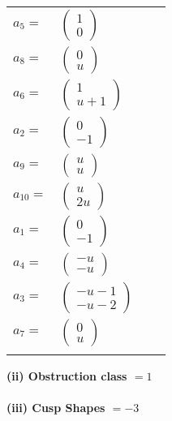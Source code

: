 \documentclass[1p]{elsarticle_modified}
\theoremstyle{definition}
\begin{document}
\begin{tabular}{m{7pt} m{180pt} m{7pt} m{180pt} }
\flushright $a_{5}=$&$\begin{pmatrix}1\\0\end{pmatrix}$ \\
\flushright $a_{8}=$&$\begin{pmatrix}0\\u\end{pmatrix}$ \\
\flushright $a_{6}=$&$\begin{pmatrix}1\\u+1\end{pmatrix}$ \\
\flushright $a_{2}=$&$\begin{pmatrix}0\\-1\end{pmatrix}$ \\
\flushright $a_{9}=$&$\begin{pmatrix}u\\u\end{pmatrix}$ \\
\flushright $a_{10}=$&$\begin{pmatrix}u\\2 u\end{pmatrix}$ \\
\flushright $a_{1}=$&$\begin{pmatrix}0\\-1\end{pmatrix}$ \\
\flushright $a_{4}=$&$\begin{pmatrix}- u\\- u\end{pmatrix}$ \\
\flushright $a_{3}=$&$\begin{pmatrix}- u-1\\- u-2\end{pmatrix}$ \\
\flushright $a_{7}=$&$\begin{pmatrix}0\\u\end{pmatrix}$\\&\end{tabular}
\flushleft \textbf{(ii) Obstruction class $= 1$}\\~\\
\flushleft \textbf{(iii) Cusp Shapes $= -3$}\\~\\
\end{document}

